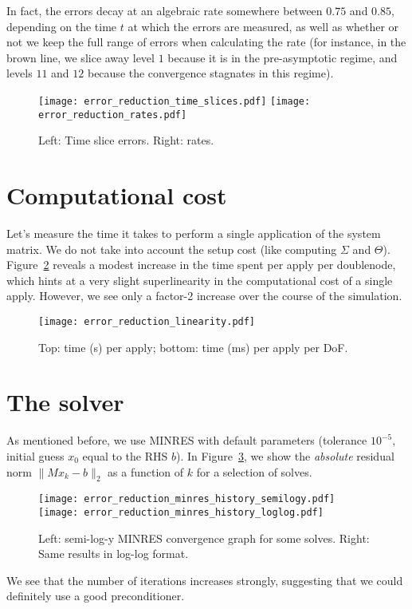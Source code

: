 \documentclass[11pt,a4paper]{amsart}
\theoremstyle{definition}
\begin{document}
In fact, the errors decay at an algebraic rate somewhere between $0.75$ and $0.85$,
depending on the time $t$ at which the errors are measured, as well as whether or
not we keep the full range of errors when calculating the rate (for instance, in
the brown line, we slice away level $1$ because it is in the pre-asymptotic regime,
and levels $11$ and $12$ because the convergence stagnates in this regime).
\begin{figure}[h!]
  \texttt{[image: error\_reduction\_time\_slices.pdf]}
  \texttt{[image: error\_reduction\_rates.pdf]}
  \caption{Left: Time slice errors. Right: rates.}
  \label{fig:time-slice}
\end{figure}

\section*{Computational cost}
Let's measure the time it takes to perform a single application of the system
matrix. We do not take into account the setup cost (like computing $\Sigma$ and
$\Theta$). Figure~\ref{fig:linearity} reveals a modest increase in the time spent
per apply per doublenode, which hints at a very slight superlinearity in the
computational cost of a single apply. However, we see only a factor-2 increase
over the course of the simulation.
\begin{figure}[h!]
  \texttt{[image: error\_reduction\_linearity.pdf]}
  \caption{Top: time (s) per apply; bottom: time (ms) per apply per DoF.}
  \label{fig:linearity}
\end{figure}

\section*{The solver}
As mentioned before, we use MINRES with default parameters (tolerance $10^{-5}$,
initial guess $x_0$ equal to the RHS $b$). In Figure~\ref{fig:minres}, we show
the \emph{absolute} residual norm $\|M x_k - b\|_2$ as a function of $k$ for a
selection of solves.
\begin{figure}[h!]
  \texttt{[image: error\_reduction\_minres\_history\_semilogy.pdf]}
  \texttt{[image: error\_reduction\_minres\_history\_loglog.pdf]}
  \caption{Left: semi-log-y MINRES convergence graph for some solves. Right: Same results in log-log format.}
  \label{fig:minres}
\end{figure}
We see that the number of iterations increases strongly, suggesting that we could
definitely use a good preconditioner.
\end{document}
